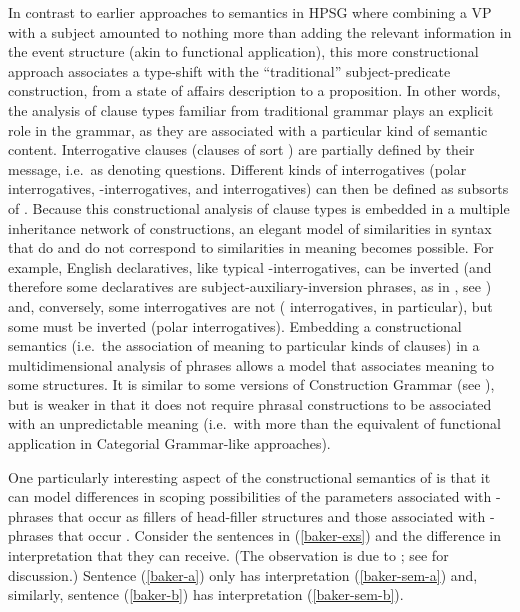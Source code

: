 \documentclass[output=paper
	        ,collection
	        ,collectionchapter
 	        ,biblatex
                ,babelshorthands
                ,newtxmath
                ,draftmode
                ,colorlinks, citecolor=brown
]{langscibook}
\begin{document}
In contrast to earlier approaches to semantics in HPSG where combining a VP with a subject amounted to nothing more than adding the relevant information in the event structure (akin to functional application), this more constructional approach associates a type-shift with the ``traditional'' subject-predicate construction, from a state of affairs description to a proposition. In other words, the analysis of clause types familiar from traditional grammar plays an explicit role in the grammar, as they are associated  with a particular kind of semantic content.  Interrogative clauses (clauses of sort ) are partially defined by their message, i.e.\ as denoting questions. Different kinds of interrogatives (polar interrogatives, -interrogatives, and  interrogatives) can then be defined as subsorts of . Because this constructional analysis of clause types is embedded in a multiple inheritance network of constructions, an elegant model of similarities in syntax that do and do not correspond to similarities in meaning becomes possible. For example, English declaratives, like typical -interrogatives, can be inverted (and therefore some declaratives are subject-auxiliary-inversion phrases, as in , see \citealt{Fillmore1999}) and, conversely, some interrogatives are not ( interrogatives, in particular), but some must be inverted (polar interrogatives). Embedding a constructional semantics (i.e.\ the association of meaning to particular kinds of clauses) in a multidimensional analysis of phrases allows a model that associates meaning to some structures.
It is similar to some versions of Construction Grammar (see ), but is weaker in that it does not require phrasal constructions to be associated with an unpredictable meaning (i.e.\ with more than the equivalent of functional application in Categorial Grammar-like approaches). 

One particularly interesting aspect of the constructional semantics of \citet{GinzburgandSag2001} is that it can model differences in scoping possibilities of the parameters associated with -phrases that occur as fillers of head-filler structures and those associated with -phrases that occur . Consider the sentences in (\ref{baker-exs}) and the difference in interpretation that they can receive. (The observation is due to \citealt{Baker1970a}; see \citealt[242--246]{GinzburgandSag2001} for discussion.) Sentence (\ref{baker-a}) only has interpretation (\ref{baker-sem-a}) and, similarly, sentence (\ref{baker-b}) has interpretation (\ref{baker-sem-b}).
\end{document}
